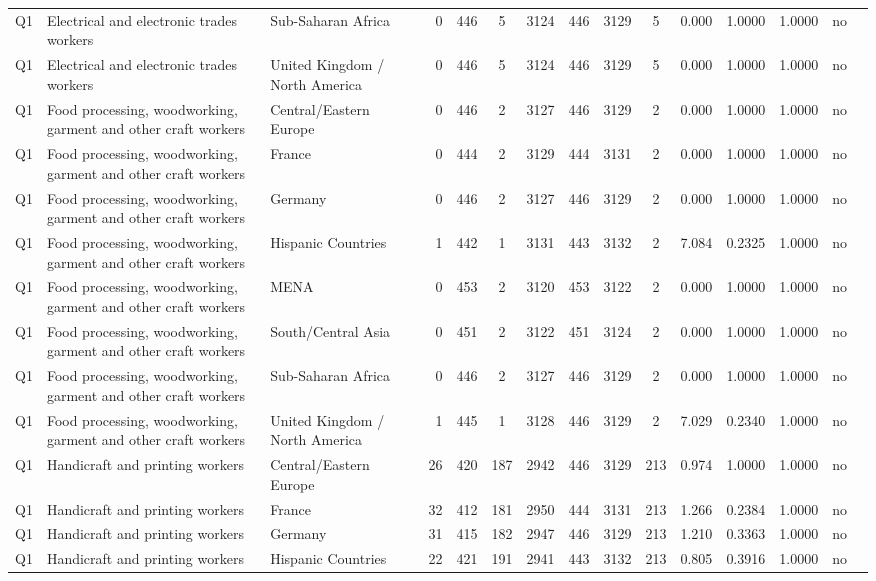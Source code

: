 \begin{longtable}{lllrcccccccccll}
Q1 & Electrical and electronic trades workers & Sub-Saharan Africa & 0 & 446 & 5 & 3124 & 446 & 3129 & 5 & 0.000 & 1.0000 & 1.0000 & no \\
Q1 & Electrical and electronic trades workers & United Kingdom / North America & 0 & 446 & 5 & 3124 & 446 & 3129 & 5 & 0.000 & 1.0000 & 1.0000 & no \\
Q1 & Food processing, woodworking, garment and other craft workers & Central/Eastern Europe & 0 & 446 & 2 & 3127 & 446 & 3129 & 2 & 0.000 & 1.0000 & 1.0000 & no \\
Q1 & Food processing, woodworking, garment and other craft workers & France & 0 & 444 & 2 & 3129 & 444 & 3131 & 2 & 0.000 & 1.0000 & 1.0000 & no \\
Q1 & Food processing, woodworking, garment and other craft workers & Germany & 0 & 446 & 2 & 3127 & 446 & 3129 & 2 & 0.000 & 1.0000 & 1.0000 & no \\
Q1 & Food processing, woodworking, garment and other craft workers & Hispanic Countries & 1 & 442 & 1 & 3131 & 443 & 3132 & 2 & 7.084 & 0.2325 & 1.0000 & no \\
Q1 & Food processing, woodworking, garment and other craft workers & MENA & 0 & 453 & 2 & 3120 & 453 & 3122 & 2 & 0.000 & 1.0000 & 1.0000 & no \\
Q1 & Food processing, woodworking, garment and other craft workers & South/Central Asia & 0 & 451 & 2 & 3122 & 451 & 3124 & 2 & 0.000 & 1.0000 & 1.0000 & no \\
Q1 & Food processing, woodworking, garment and other craft workers & Sub-Saharan Africa & 0 & 446 & 2 & 3127 & 446 & 3129 & 2 & 0.000 & 1.0000 & 1.0000 & no \\
Q1 & Food processing, woodworking, garment and other craft workers & United Kingdom / North America & 1 & 445 & 1 & 3128 & 446 & 3129 & 2 & 7.029 & 0.2340 & 1.0000 & no \\
Q1 & Handicraft and printing workers & Central/Eastern Europe & 26 & 420 & 187 & 2942 & 446 & 3129 & 213 & 0.974 & 1.0000 & 1.0000 & no \\
Q1 & Handicraft and printing workers & France & 32 & 412 & 181 & 2950 & 444 & 3131 & 213 & 1.266 & 0.2384 & 1.0000 & no \\
Q1 & Handicraft and printing workers & Germany & 31 & 415 & 182 & 2947 & 446 & 3129 & 213 & 1.210 & 0.3363 & 1.0000 & no \\
Q1 & Handicraft and printing workers & Hispanic Countries & 22 & 421 & 191 & 2941 & 443 & 3132 & 213 & 0.805 & 0.3916 & 1.0000 & no \\

\end{longtable}
